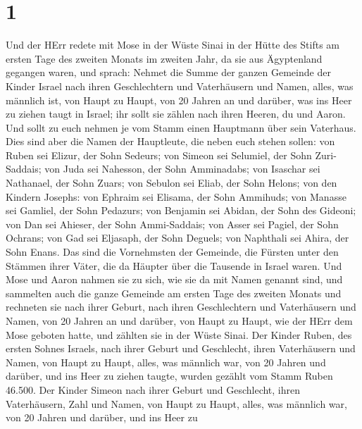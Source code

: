 \hypertarget{section}{%
\section{1}\label{section}}

 Und der HErr redete mit Mose in der Wüste Sinai in der
Hütte des Stifts am ersten Tage des zweiten Monats im zweiten Jahr, da
sie aus Ägyptenland gegangen waren, und sprach:  Nehmet die
Summe der ganzen Gemeinde der Kinder Israel nach ihren Geschlechtern und
Vaterhäusern und Namen, alles, was männlich ist, von Haupt zu Haupt,
 von 20 Jahren an und darüber, was ins Heer zu ziehen taugt
in Israel; ihr sollt sie zählen nach ihren Heeren, du und Aaron.
 Und sollt zu euch nehmen je vom Stamm einen Hauptmann über
sein Vaterhaus.  Dies sind aber die Namen der Hauptleute,
die neben euch stehen sollen: von Ruben sei Elizur, der Sohn Sedeurs;
 von Simeon sei Selumiel, der Sohn Zuri-Saddais;
 von Juda sei Nahesson, der Sohn Amminadabs; 
von Isaschar sei Nathanael, der Sohn Zuars;  von Sebulon sei
Eliab, der Sohn Helons;  von den Kindern Josephs: von
Ephraim sei Elisama, der Sohn Ammihuds; von Manasse sei Gamliel, der
Sohn Pedazurs;  von Benjamin sei Abidan, der Sohn des
Gideoni;  von Dan sei Ahieser, der Sohn Ammi-Saddais;
 von Asser sei Pagiel, der Sohn Ochrans;  von
Gad sei Eljasaph, der Sohn Deguels;  von Naphthali sei
Ahira, der Sohn Enans.  Das sind die Vornehmsten der
Gemeinde, die Fürsten unter den Stämmen ihrer Väter, die da Häupter über
die Tausende in Israel waren.  Und Mose und Aaron nahmen
sie zu sich, wie sie da mit Namen genannt sind,  und
sammelten auch die ganze Gemeinde am ersten Tage des zweiten Monats und
rechneten sie nach ihrer Geburt, nach ihren Geschlechtern und
Vaterhäusern und Namen, von 20 Jahren an und darüber, von Haupt zu
Haupt,  wie der HErr dem Mose geboten hatte, und zählten
sie in der Wüste Sinai.  Der Kinder Ruben, des ersten
Sohnes Israels, nach ihrer Geburt und Geschlecht, ihren Vaterhäusern und
Namen, von Haupt zu Haupt, alles, was männlich war, von 20 Jahren und
darüber, und ins Heer zu ziehen taugte,  wurden gezählt vom
Stamm Ruben 46.500.  Der Kinder Simeon nach ihrer Geburt
und Geschlecht, ihren Vaterhäusern, Zahl und Namen, von Haupt zu Haupt,
alles, was männlich war, von 20 Jahren und darüber, und ins Heer zu
